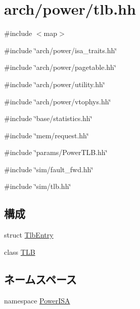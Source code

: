 \hypertarget{arch_2power_2tlb_8hh}{
\section{arch/power/tlb.hh}
\label{arch_2power_2tlb_8hh}
}
{\ttfamily \#include $<$map$>$}\par
{\ttfamily \#include \char`\"{}arch/power/isa\_\-traits.hh\char`\"{}}\par
{\ttfamily \#include \char`\"{}arch/power/pagetable.hh\char`\"{}}\par
{\ttfamily \#include \char`\"{}arch/power/utility.hh\char`\"{}}\par
{\ttfamily \#include \char`\"{}arch/power/vtophys.hh\char`\"{}}\par
{\ttfamily \#include \char`\"{}base/statistics.hh\char`\"{}}\par
{\ttfamily \#include \char`\"{}mem/request.hh\char`\"{}}\par
{\ttfamily \#include \char`\"{}params/PowerTLB.hh\char`\"{}}\par
{\ttfamily \#include \char`\"{}sim/fault\_\-fwd.hh\char`\"{}}\par
{\ttfamily \#include \char`\"{}sim/tlb.hh\char`\"{}}\par
\subsection*{構成}
\begin{DoxyCompactItemize}
\item 
struct \hyperlink{structPowerISA_1_1TlbEntry}{TlbEntry}
\item 
class \hyperlink{classPowerISA_1_1TLB}{TLB}
\end{DoxyCompactItemize}
\subsection*{ネームスペース}
\begin{DoxyCompactItemize}
\item 
namespace \hyperlink{namespacePowerISA}{PowerISA}
\end{DoxyCompactItemize}

